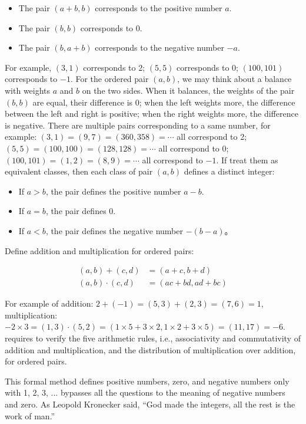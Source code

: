 \documentclass[b5paper]{article}
\begin{document}
\begin{itemize}
\item The pair $(a + b, b)$ corresponds to the positive number $a$.
\item The pair $(b, b)$ corresponds to 0.
\item The pair $(b, a + b)$ corresponds to the negative number $-a$.
\end{itemize}

For example, $(3, 1)$ corresponds to 2; $(5, 5)$ corresponds to 0; $(100, 101)$ corresponds to $-1$. For the ordered pair $(a, b)$, we may think about a balance with weights $a$ and $b$ on the two sides. When it balances, the weights of the pair $(b, b)$ are equal, their difference is 0; when the left weights more, the difference between the left and right is positive; when the right weights more, the difference is negative. There are multiple pairs corresponding to a same number, for example: $(3, 1) = (9, 7) = (360, 358) = \cdots$ all correspond to 2; $(5, 5) = (100, 100) = (128, 128) = \cdots$ all correspond to 0; $(100, 101) = (1, 2) = (8, 9) = \cdots$ all correspond to $-1$. If treat them as equivalent classes, then each class of pair $(a, b)$ defines a distinct integer:

\begin{itemize}
\item If $a > b$, the pair defines the positive number $a - b$.
\item If $a = b$, the pair defines 0.
\item If $a < b$, the pair defines the negative number $-(b - a)$。
\end{itemize}

Define addition and multiplication for ordered pairs:

\begin{align}
(a, b) + (c, d) &= (a + c, b + d) \\
(a, b) \cdot (c, d) &= (ac + bd, ad + bc)
\label{eq:pair-add-mul}
\end{align}

For example of addition: $2 + (-1) = (5, 3) + (2, 3) = (7, 6) = 1$, multiplication: $-2 \times 3 = (1, 3) \cdot (5, 2) = (1 \times 5 + 3 \times 2, 1 \times 2 + 3 \times 5) = (11, 17) = -6$.  requires to verify the five arithmetic rules, i.e., associativity and commutativity of addition and multiplication, and the distribution of multiplication over addition, for ordered pairs.

This formal method defines positive numbers, zero, and negative numbers only with 1, 2, 3, ... bypasses all the questions to the meaning of negative numbers and zero. As Leopold Kronecker said, \enquote{God made the integers, all the rest is the work of man.}
\end{document}
